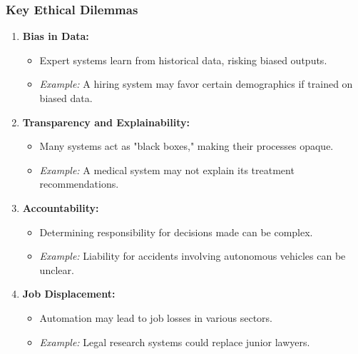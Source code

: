 \documentclass[aspectratio=169]{beamer}
\begin{document}
\begin{frame}[fragile]
    \frametitle{Key Ethical Dilemmas}
    \begin{enumerate}
        \item \textbf{Bias in Data:}
        \begin{itemize}
            \item Expert systems learn from historical data, risking biased outputs.
            \item \textit{Example:} A hiring system may favor certain demographics if trained on biased data.
        \end{itemize}

        \item \textbf{Transparency and Explainability:}
        \begin{itemize}
            \item Many systems act as "black boxes," making their processes opaque.
            \item \textit{Example:} A medical system may not explain its treatment recommendations.
        \end{itemize}

        \item \textbf{Accountability:}
        \begin{itemize}
            \item Determining responsibility for decisions made can be complex.
            \item \textit{Example:} Liability for accidents involving autonomous vehicles can be unclear.
        \end{itemize}

        \item \textbf{Job Displacement:}
        \begin{itemize}
            \item Automation may lead to job losses in various sectors.
            \item \textit{Example:} Legal research systems could replace junior lawyers.
        \end{itemize}
    \end{enumerate}
\end{frame}
\end{document}
